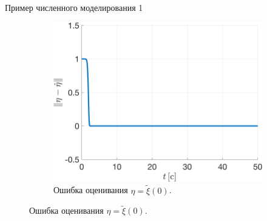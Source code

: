 \begin{frame}{Пример численного моделирования  1}
\begin{figure}[!h]
\begin{subfigure}[t]{0.45\textwidth}
			\centering
			\includegraphics[width=0.5\linewidth]{figures/3.1eeta.png}
			\caption{Ошибка оценивания $\eta = \tilde \xi(0)$.}
		\end{subfigure}
		\label{f1}
	\end{figure}
\end{frame}